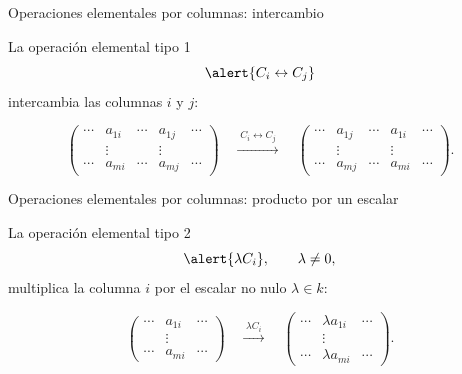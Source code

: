 \begin{frame}{Operaciones elementales por columnas: intercambio}

La \alert{operación elemental tipo 1}
\[
\alert{C_i\leftrightarrow C_j}
\]
intercambia las columnas \(i\) y \(j\):

\medskip

\[
\begin{pmatrix}
\cdots & a_{1i} & \cdots & a_{1j} & \cdots\\
       & \vdots &        & \vdots &       \\
\cdots & a_{mi} & \cdots & a_{mj} & \cdots
\end{pmatrix}
\quad
\xrightarrow{\;C_i\leftrightarrow C_j\;}
\quad
\begin{pmatrix}
\cdots & a_{1j} & \cdots & a_{1i} & \cdots\\
       & \vdots &        & \vdots &       \\
\cdots & a_{mj} & \cdots & a_{mi} & \cdots
\end{pmatrix}.
\]

\end{frame}

\begin{frame}{Operaciones elementales por columnas: producto por un escalar}

La \alert{operación elemental tipo 2}
\[
\alert{\lambda C_i},
\qquad \lambda\neq0,
\]
multiplica la columna \(i\) por el escalar no nulo
\(\lambda\in k\):

\medskip

\[
\begin{pmatrix}
\cdots & a_{1i} & \cdots\\
       & \vdots &       \\
\cdots & a_{mi} & \cdots
\end{pmatrix}
\quad
\xrightarrow{\;\lambda C_i\;}
\quad
\begin{pmatrix}
\cdots & \lambda a_{1i} & \cdots\\
       & \vdots          &       \\
\cdots & \lambda a_{mi} & \cdots
\end{pmatrix}.
\]

\end{frame}

